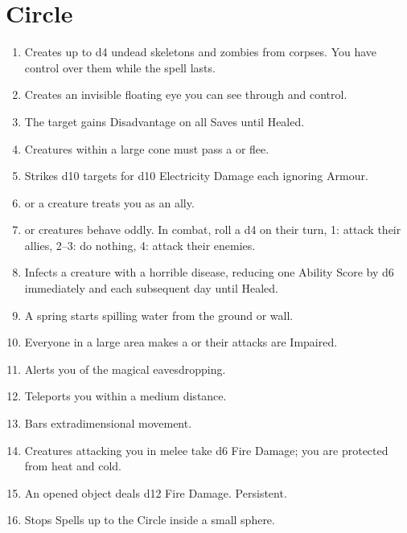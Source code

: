 \documentclass[itdr]{subfiles}
\begin{document}

\vfill
\break

\section{ Circle}
\def \spellcircle {4}
\begin{enumerate}
	\item {} Creates up to d4 undead skeletons and zombies from corpses. You have \mbox{control} over them while the spell lasts.
	\item {} Creates an invisible floating eye you can see through and control.
	\item {} The target gains Disadvantage on all Saves until Healed.
	\item {} Creatures within a large cone must pass a  or flee.
	\item {} Strikes d10 targets for d10 Electricity Damage each ignoring Armour.
	\item {}  or a creature treats you as an ally.
	\item {}  or creatures behave oddly. In combat, roll a d4 on their turn, 1: attack their allies, 2--3: do nothing, 4: attack their enemies.
	\item {} Infects a creature with a \mbox{horrible} disease, reducing one Ability Score by d6 immediately and each subsequent day until Healed.
	\item {} A spring starts spilling water from the ground or wall.
	\item {} Everyone in a large area makes a  or their attacks are Impaired.
	\item {} Alerts you of the magical eavesdropping.
	\item {} Teleports you within a medium distance.
	\item {} Bars extradimensional movement.
	\item {} Creatures attacking you in melee take d6 Fire Damage; you are protected from heat and cold.
	\item {} An opened object deals d12 Fire Damage. Persistent.
	\item {} Stops Spells up to the  Circle inside a small sphere.

\end{enumerate}
\end{document}
